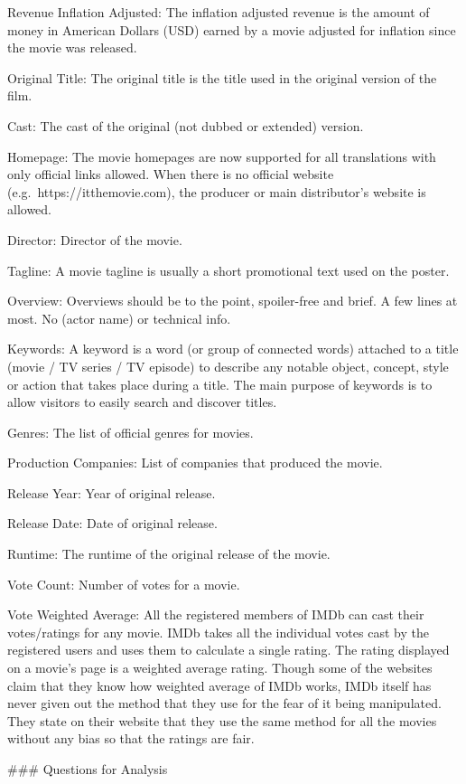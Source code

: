 \documentclass[11pt]{article}
\begin{document}
Revenue Inflation Adjusted: The inflation adjusted revenue is the amount
of money in American Dollars (USD) earned by a movie adjusted for
inflation since the movie was released.

Original Title: The original title is the title used in the original
version of the film.

Cast: The cast of the original (not dubbed or extended) version.

Homepage: The movie homepages are now supported for all translations
with only official links allowed. When there is no official website
(e.g.~https://itthemovie.com), the producer or main distributor's
website is allowed.

Director: Director of the movie.

Tagline: A movie tagline is usually a short promotional text used on the
poster.

Overview: Overviews should be to the point, spoiler-free and brief. A
few lines at most. No (actor name) or technical info.

Keywords: A keyword is a word (or group of connected words) attached to
a title (movie / TV series / TV episode) to describe any notable object,
concept, style or action that takes place during a title. The main
purpose of keywords is to allow visitors to easily search and discover
titles.

Genres: The list of official genres for movies.

Production Companies: List of companies that produced the movie.

Release Year: Year of original release.

Release Date: Date of original release.

Runtime: The runtime of the original release of the movie.

Vote Count: Number of votes for a movie.

Vote Weighted Average: All the registered members of IMDb can cast their
votes/ratings for any movie. IMDb takes all the individual votes cast by
the registered users and uses them to calculate a single rating. The
rating displayed on a movie's page is a weighted average rating. Though
some of the websites claim that they know how weighted average of IMDb
works, IMDb itself has never given out the method that they use for the
fear of it being manipulated. They state on their website that they use
the same method for all the movies without any bias so that the ratings
are fair.

 \#\#\# Questions for Analysis
\end{document}
